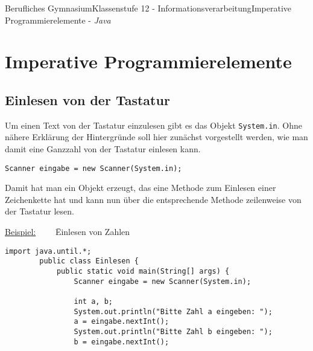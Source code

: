\documentclass[oneside,openany,headings=optiontotoc,11pt,numbers=noenddot]{article}
\begin{document}
	\begin{worksheet}{Berufliches Gymnasium}{Klassenstufe 12 - Informationsverarbeitung}{Imperative Programmierelemente - \textit{Java}}
		
		\section{Imperative Programmierelemente}
		\subsection*{Einlesen von der Tastatur}
		Um einen Text von der Tastatur einzulesen gibt es das Objekt \lstinline[style=JavaInputStyle]|System.in|. Ohne nähere Erklärung der Hintergründe soll hier zunächst vorgestellt werden, wie man damit eine Ganzzahl von der Tastatur einlesen kann.
		\begin{lstlisting}[style=JavaInputStyle]
		Scanner eingabe = new Scanner(System.in);
		\end{lstlisting}
		Damit hat man ein Objekt erzeugt, das eine Methode zum Einlesen einer Zeichenkette hat und kann nun über die entsprechende Methode zeilenweise von der Tastatur lesen.
		\begin{tabbing}
			\underline{Beispiel:}~~~~ \= Einlesen von Zahlen
		\end{tabbing}
		\begin{lstlisting}[style=JavaInputStyle]
		import java.until.*;
		public class Einlesen {
			public static void main(String[] args) {
				Scanner eingabe = new Scanner(System.in);
				
				int a, b;
				System.out.println("Bitte Zahl a eingeben: ");
				a = eingabe.nextInt();
				System.out.println("Bitte Zahl b eingeben: ");
				b = eingabe.nextInt();
				

\end{lstlisting}
\end{worksheet}
\end{document}
